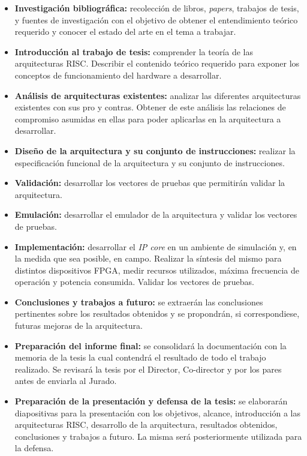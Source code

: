 \documentclass[a4paper]{article}
\begin{document}
\begin{itemize}
    \item \textbf{Investigación bibliográfica:} recolección de libros, \emph{papers}, trabajos de tesis, y fuentes de investigación con el objetivo de obtener el entendimiento teórico requerido y conocer el estado del arte en el tema a trabajar.
    \item \textbf{Introducción al trabajo de tesis:} comprender la teoría de las arquitecturas RISC. Describir el contenido teórico requerido para exponer los conceptos de funcionamiento del hardware a desarrollar.
    \item \textbf{Análisis de arquitecturas existentes:} analizar las diferentes arquitecturas existentes con sus pro y contras. Obtener de este análisis las relaciones de compromiso asumidas en ellas para poder aplicarlas en la arquitectura a desarrollar.
    \item \textbf{Diseño de la arquitectura y su conjunto de instrucciones:} realizar la especificación funcional de la arquitectura y su conjunto de instrucciones.
    \item \textbf{Validación:} desarrollar los vectores de pruebas que permitirán validar la arquitectura.
    \item \textbf{Emulación:} desarrollar el emulador de la arquitectura y validar los vectores de pruebas.
    \item \textbf{Implementación:} desarrollar el \emph{IP core} en un ambiente de simulación y, en la medida que sea posible, en campo. Realizar la síntesis del mismo para distintos dispositivos FPGA, medir recursos utilizados, máxima frecuencia de operación y potencia consumida. Validar los vectores de pruebas.
    \item \textbf{Conclusiones y trabajos a futuro:} se extraerán las conclusiones pertinentes sobre los resultados obtenidos y se propondrán, si correspondiese, futuras mejoras de la arquitectura.
    \item \textbf{Preparación del informe final:} se consolidará la documentación con la memoria de la tesis la cual contendrá el resultado de todo el trabajo realizado. Se revisará la tesis por el Director, Co-director y por los pares antes de enviarla al Jurado.
    \item \textbf{Preparación de la presentación y defensa de la tesis:} se elaborarán diapositivas para la presentación con los objetivos, alcance, introducción a las arquitecturas RISC, desarrollo de la arquitectura, resultados obtenidos, conclusiones y trabajos a futuro. La misma será posteriormente utilizada para la defensa.
\end{itemize}
\end{document}

